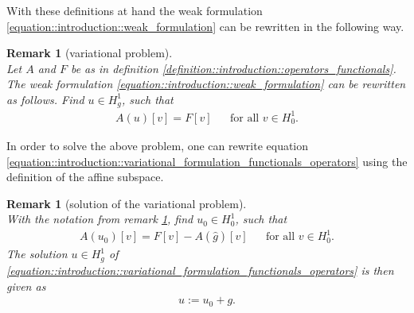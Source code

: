 \documentclass[a4paper,11pt]{article}
\numberwithin{equation}{section}
\newtheorem{remark}[definition]{Remark}
\newcommand{\theoremNewline}{\hspace{1mm}\\}
\newcommand{\theoremEndLine}{\hspace{1mm}}
\newcommand{\punkt}{\text{.}}
\begin{document}
    With these definitions at hand the weak formulation \eqref{equation::introduction::weak_formulation} can be
    rewritten in the following way.

    \begin{remark}[variational problem]\theoremNewline
      \label{remark::introduction::variational_formulation_functionals_operators}
      Let $A$ and $F$ be as in definition \ref{definition::introduction::operators_functionals}. The weak formulation
      \eqref{equation::introduction::weak_formulation} can be rewritten as follows.
      Find ${u \in H^1_g}$, such that
      \begin{align}
        \label{equation::introduction::variational_formulation_functionals_operators}
        A(u)[v] = F[v] &&\text{for all } v\in H^1_0 \punkt
      \end{align}
    \end{remark}\theoremEndLine

    In order to solve the above problem, one can rewrite equation
    \eqref{equation::introduction::variational_formulation_functionals_operators} using the definition of the affine
    subspace.

    \begin{remark}[solution of the variational problem]\theoremNewline
      \label{remark::introduction::solution_of_the_variational_problem}
      With the notation from remark \ref{remark::introduction::variational_formulation_functionals_operators}, find
      ${u_{0} \in H^{1}_{0}}$, such that
      \begin{align}
        \label{equation::introduction::variational_formulation_in_h_1_0}
        A(u_{0})[v] = F[v] - A(\hat{g})[v] &&\text{for all } v\in H^1_0 \punkt
      \end{align}
      The solution ${u \in H^{1}_{g}}$ of \eqref{equation::introduction::variational_formulation_functionals_operators}
      is then given as
      \begin{align}
        \label{equation::introduction::solution}
        u := u_{0} + g\punkt
      \end{align}
    \end{remark}\theoremEndLine
\end{document}
